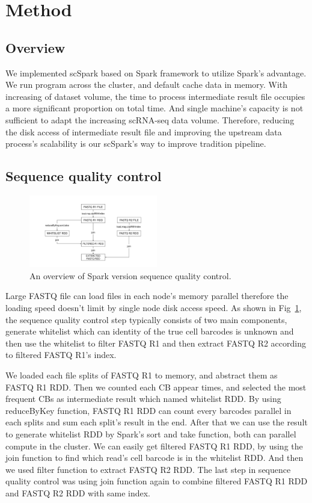 \documentclass[conference]{IEEEtran}
\begin{document}
\section{Method}
\subsection{Overview}
We implemented scSpark based on Spark framework to utilize Spark's advantage. 
We run program across the cluster, and default cache data in memory. 
With increasing of dataset volume, the time to process intermediate result file occupies a more significant proportion on total time. 
And single machine's capacity is not sufficient to adapt the increasing scRNA-seq data volume. 
Therefore, reducing the disk access of intermediate result file and improving the upstream data process's scalability is our scSpark's way to improve tradition pipeline. 

\subsection{Sequence quality control}
\begin{figure}
  \includegraphics[width=0.5\textwidth]{fig1.pdf}
  \caption{An overview of Spark version sequence quality control.} \label{fig1}
\end{figure} 

Large FASTQ file can load files in each node's memory parallel therefore the loading speed doesn't limit by single node disk access speed. 
As shown in Fig~\ref{fig1}, the sequence quality control step typically consists of two main components, generate whitelist which can identity of the true cell barcodes is unknown and then use the whitelist to filter FASTQ R1 and then extract FASTQ R2 according to filtered FASTQ R1's index. 

We loaded each file splits of FASTQ R1 to memory, and abstract them as FASTQ R1 RDD. 
Then we counted each CB appear times, and selected the most frequent CBs as intermediate result which named whitelist RDD. 
By using reduceByKey function, FASTQ R1 RDD can count every barcodes parallel in each splits and sum each split's result in the end. 
After that we can use the result to generate whitelist RDD by Spark's sort and take function, both can parallel compute in the cluster. 
We can easily get filtered FASTQ R1 RDD, by using the join function to find which read's cell barcode is in the whitelist RDD. 
And then we used filter function to extract FASTQ R2 RDD. 
The last step in sequence quality control was using join function again to combine filtered FASTQ R1 RDD and FASTQ R2 RDD with same index. 
\end{document}
